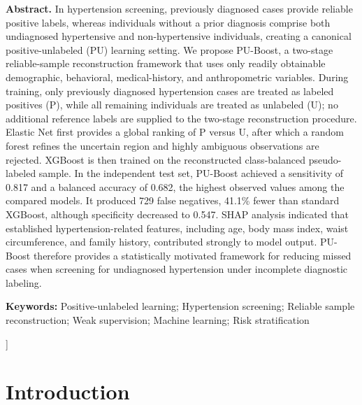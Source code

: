 \documentclass[10pt]{article}
\begin{document}
{\begin{@twocolumnfalse}
\vspace{7pt}
\begin{center}
\begin{minipage}{0.90\textwidth}
\noindent\textbf{Abstract.} In hypertension screening, previously diagnosed cases provide reliable
positive labels, whereas individuals without a prior diagnosis comprise
both undiagnosed hypertensive and non-hypertensive individuals, creating
a canonical positive-unlabeled (PU) learning setting. We propose
PU-Boost, a two-stage reliable-sample reconstruction framework that uses
only readily obtainable demographic, behavioral, medical-history, and
anthropometric variables. During training, only previously diagnosed
hypertension cases are treated as labeled positives (P), while all
remaining individuals are treated as unlabeled (U); no additional
reference labels are supplied to the two-stage reconstruction procedure.
Elastic Net first provides a global ranking of P versus U, after which a
random forest refines the uncertain region and highly ambiguous
observations are rejected. XGBoost is then trained on the reconstructed
class-balanced pseudo-labeled sample. In the independent test set,
PU-Boost achieved a sensitivity of 0.817 and a balanced accuracy of
0.682, the highest observed values among the compared models. It
produced 729 false negatives, 41.1\% fewer than standard XGBoost,
although specificity decreased to 0.547. SHAP analysis indicated that
established hypertension-related features, including age, body mass
index, waist circumference, and family history, contributed strongly to
model output. PU-Boost therefore provides a statistically motivated
framework for reducing missed cases when screening for undiagnosed
hypertension under incomplete diagnostic labeling.

\vspace{3pt}
\noindent\textbf{Keywords:} Positive-unlabeled learning; Hypertension screening; Reliable sample reconstruction; Weak supervision; Machine learning; Risk stratification
\end{minipage}
\end{center}
\vspace{7pt}
\end{@twocolumnfalse}
}]

\section{Introduction}
\end{document}

